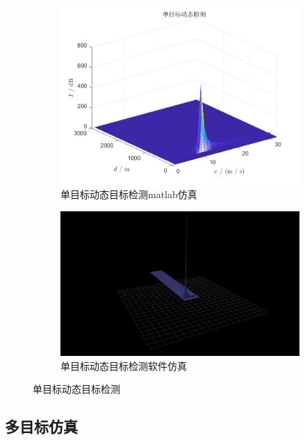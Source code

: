 \documentclass{article}
\newcounter{sub}
\begin{document}
\begin{figure}[H]
	\centering
	\begin{subfigure}[H]{.6\linewidth}
		\centering
		\includegraphics[width=\linewidth]{one-MTD-matlab.png}
		\caption{单目标动态目标检测matlab仿真}
		\label{fig:单目标动态目标检测matlab仿真}
	\end{subfigure}
	\quad
	\begin{subfigure}[H]{.6\linewidth}
		\centering
		\includegraphics[width=\linewidth]{one-MTD-software.png}
		\caption{单目标动态目标检测软件仿真}
		\label{fig:单目标动态目标检测软件仿真}
	\end{subfigure}
	\caption{单目标动态目标检测}
	\label{fig:单目标动态目标检测}
\end{figure}

\subsection{多目标仿真}%
\label{sub:多目标仿真}
\end{document}
